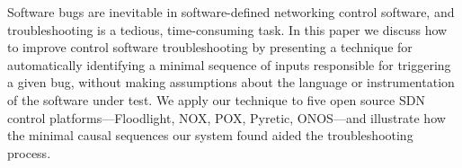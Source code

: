 Software bugs are inevitable in software-defined networking control software,
and troubleshooting
is a tedious, time-consuming task. In this paper we discuss how to improve
control software troubleshooting by presenting a technique
for automatically identifying
a minimal sequence of inputs responsible for triggering a given bug, without
making assumptions about the language or instrumentation of the software under
test. We apply our technique to five open source SDN control
platforms---Floodlight, NOX, POX, Pyretic, ONOS---and
illustrate how the minimal causal sequences our system found aided the
troubleshooting process.
